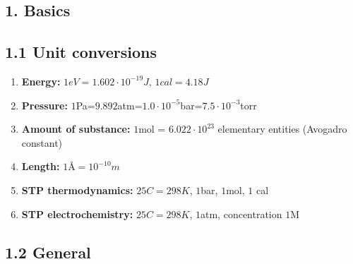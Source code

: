 




\begin{multicols*}{4}


\section{1. Basics}

\subsection{1.1 Unit conversions}{
	\begin{enumerate}[noitemsep]
    	\item \textbf{Energy:} $1eV=1.602\cdot 10^{-19}J$,    $1cal=4.18J$
    	\item \textbf{Pressure:} $1$Pa=$9.892$atm=$1.0\cdot 10^{-5}$bar=$7.5\cdot 10^{-3}$torr
    	\item \textbf{Amount of substance:} $1$mol = $6.022\cdot 10^{23}$ elementary entities (Avogadro constant)
    	\item \textbf{Length:} $1\text{Å}=10^{-10}m$
    	\item \textbf{STP thermodynamics: } $25C=298K$,  $1$bar,  $1$mol, $1$ cal
    	\item \textbf{STP electrochemistry: } $25C=298K$,  $1$atm, concentration $1$M
	\end{enumerate}
}


\subsection{1.2 General}{

}
\end{multicols*}
